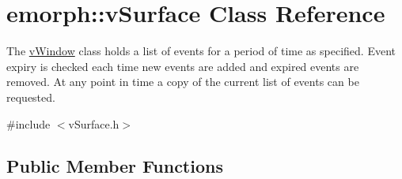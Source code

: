 \hypertarget{classemorph_1_1vSurface}{\section{emorph\-:\-:v\-Surface Class Reference}
\label{classemorph_1_1vSurface}
}


The \hyperlink{classemorph_1_1vWindow}{v\-Window} class holds a list of events for a period of time as specified. Event expiry is checked each time new events are added and expired events are removed. At any point in time a copy of the current list of events can be requested.  




{\ttfamily \#include $<$v\-Surface.\-h$>$}

\subsection*{Public Member Functions}
